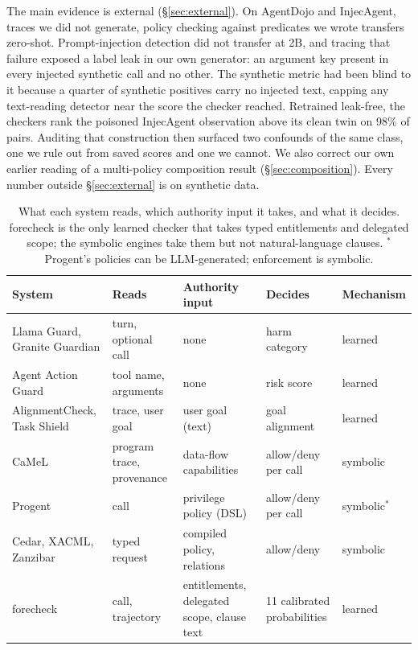 The main evidence is external (\S\ref{sec:external}). On AgentDojo and
InjecAgent, traces we did not generate, policy checking against predicates
we wrote transfers zero-shot. Prompt-injection detection did not transfer at
2B, and tracing that failure exposed a label leak in our own generator: an
argument key present in every injected synthetic call and no other. The
synthetic metric had been blind to it because a quarter of synthetic
positives carry no injected text, capping any text-reading detector near the
score the checker reached. Retrained leak-free, the checkers rank the
poisoned InjecAgent observation above its clean twin on 98\% of pairs.
Auditing that construction then surfaced two confounds of the same class,
one we rule out from saved scores and one we cannot. We also correct our own
earlier reading of a multi-policy composition result
(\S\ref{sec:composition}). Every number outside \S\ref{sec:external} is on
synthetic data.

\begin{table}[t]
\centering
\small
\setlength{\tabcolsep}{5pt}
\begin{tabular}{@{}lllll@{}}
\toprule
System & Reads & Authority input & Decides & Mechanism \\
\midrule
Llama Guard, Granite Guardian & turn, optional call & none & harm category & learned \\
Agent Action Guard & tool name, arguments & none & risk score & learned \\
AlignmentCheck, Task Shield & trace, user goal & user goal (text) & goal alignment & learned \\
CaMeL & program trace, provenance & data-flow capabilities & allow/deny per call & symbolic \\
Progent & call & privilege policy (DSL) & allow/deny per call & symbolic$^{\ast}$ \\
Cedar, XACML, Zanzibar & typed request & compiled policy, relations & allow/deny & symbolic \\
forecheck & call, trajectory & entitlements, delegated scope, clause text & 11 calibrated probabilities & learned \\
\bottomrule
\end{tabular}
\caption{What each system reads, which authority input it takes, and what it decides. forecheck is the only learned checker that takes typed entitlements and delegated scope; the symbolic engines take them but not natural-language clauses. $^{\ast}$Progent's policies can be LLM-generated; enforcement is symbolic.}
\label{tab:related}
\end{table}
